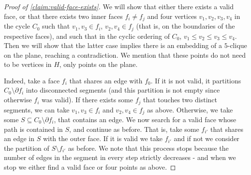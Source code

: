 \documentclass[10pt,a4paper]{article}
\newcommand{\prettyref}[1]{\cref{#1}}
\theoremstyle{definition}
\theoremstyle{remark}
\newtheorem{claim}[theorem]{Claim}
\newcommand{\set}[1]{\{#1\}}
\renewcommand{\leq}{\leqslant}
\numberwithin{equation}{section}
\let\pref=\prettyref
\newcommand{\boundary}{\partial}
\begin{document}

%

\begin{proof}[Proof of \pref{claim:valid-face-exists}]
    We will show that either there exists a valid face, or that there exists two inner faces \(f_i \ne f_j\) and four vertices \(v_1,v_2,v_3,v_4\) in the cycle \(C_0\) such that \(v_1,v_3 \in f_i\), \(v_2,v_4 \in f_j\) (that is, on the boundaries of the respective faces), and such that in the cyclic ordering of \(C_0\), \(v_1 \leq v_2 \leq v_3 \leq v_4\). Then we will show that the latter case implies there is an embedding of a \(5\)-clique on the plane, reaching a contradiction. We mention that these points do not need to be vertices in \(H\), only points on the plane.
    
    Indeed, take a face \(f_i\) that shares an edge with \(f_0\). If it is not valid, it partitions \(C_0 \setminus \boundary f_i\) into disconnected segments (and this partition is not empty since otherwise \(f_i\) was valid). If there exists some \(f_j\) that touches two distinct segments, we can take \(v_1,v_3 \in f_i\) and \(v_2,v_4 \in f_j\) as above. Otherwise, we take some \(S \subseteq C_0 \setminus \boundary f_i\), that contains an edge. We now search for a valid face whose path is contained in \(S\), and continue as before. That is, take some \(f_{i'}\) that shares an edge in \(S\) with the outer face. If it is valid we take \(f_{i'}\) and if not we consider the partition of \(S \setminus f_{i'}\) as before. We note that this process stops because the number of edges in the segment in every step strictly decreases - and when we stop we either find a valid face or four points as above.
    

\end{proof}
\end{document}
